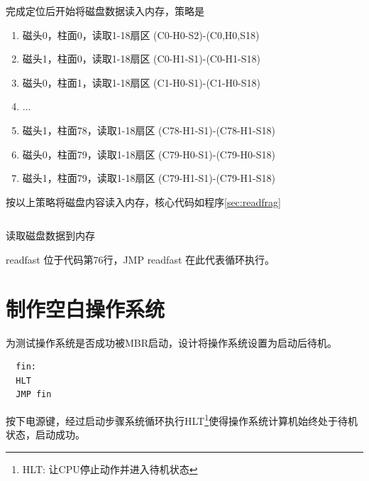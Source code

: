完成定位后开始将磁盘数据读入内存，策略是
\begin{enumerate}
\item 磁头0，柱面0，读取1-18扇区 (C0-H0-S2)-(C0,H0,S18)
\item 磁头1，柱面0，读取1-18扇区 (C0-H1-S1)-(C0-H1-S18)
\item 磁头0，柱面1，读取1-18扇区 (C1-H0-S1)-(C1-H0-S18)
\item ...
\item 磁头1，柱面78，读取1-18扇区 (C78-H1-S1)-(C78-H1-S18)
\item 磁头0，柱面79，读取1-18扇区 (C79-H0-S1)-(C79-H0-S18)
\item 磁头1，柱面79，读取1-18扇区 (C79-H1-S1)-(C79-H1-S18)
\end{enumerate}

按以上策略将磁盘内容读入内存，核心代码如程序\ref{sec:readfrag}
\begin{listing}[H]
  \inputminted[tabsize=2, firstline=138, lastline=147,
  linenos=true]{nasm}{../ZOS/src/kernel/ipl09.nas}
  \caption{读取磁盘数据到内存}
  \label{sec:readfrag}
\end{listing}
readfast 位于代码第76行，JMP readfast 在此代表循环执行。

\section{制作空白操作系统}

为测试操作系统是否成功被MBR启动，设计将操作系统设置为启动后待机。

\begin{verbatim}
  fin:
  HLT
  JMP fin
\end{verbatim}

按下电源键，经过启动步骤系统循环执行HLT\footnote{HLT: 让CPU停止动作并进入待机状态}使得操作系统计算机始终处于待机状态，启动成功。

